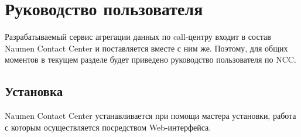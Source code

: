\chapter{Руководство пользователя}

Разрабатываемый сервис агрегации данных по call-центру входит в состав Naumen Contact Center и поставляется вместе с ним же.
Поэтому, для общих моментов в текущем разделе будет приведено руководство пользователя по NCC\@.

\section{Установка}


%
%
%

Naumen Contact Center устанавливается при помощи мастера установки, работа с которым осуществляется посредством Web-интерфейса.

